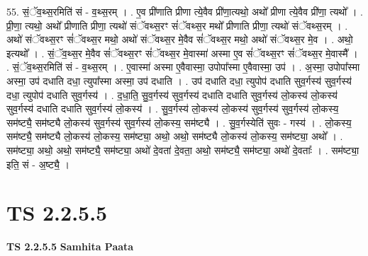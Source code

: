 \documentclass[17pt]{extarticle}
\begin{document}
55. सं॒ॅव॒थ्स॒रमिति॑ सं - व॒थ्स॒रम् । . ए॒व प्री॑णाति प्रीणा त्ये॒वैव प्री॑णा॒त्यथो॒ अथो᳚ प्रीणा त्ये॒वैव प्री॑णा॒ त्यथो᳚ । . प्री॒णा॒ त्यथो॒ अथो᳚ प्रीणाति प्रीणा॒ त्यथो॑ संॅवथ्स॒रꣳ सं॑ॅवथ्स॒र मथो᳚ प्रीणाति प्रीणा॒ त्यथो॑ संॅवथ्स॒रम् । . अथो॑ संॅवथ्स॒रꣳ सं॑ॅवथ्स॒र मथो॒ अथो॑ संॅवथ्स॒र मे॒वैव सं॑ॅवथ्स॒र मथो॒ अथो॑ संॅवथ्स॒र मे॒व । . अथो॒ इत्यथो᳚ । . सं॒ॅव॒थ्स॒र मे॒वैव सं॑ॅवथ्स॒रꣳ सं॑ॅवथ्स॒र मे॒वास्मा॑ अस्मा ए॒व सं॑ॅवथ्स॒रꣳ सं॑ॅवथ्स॒र मे॒वास्मै᳚ । . सं॒ॅव॒थ्स॒रमिति॑ सं - व॒थ्स॒रम् । . ए॒वास्मा॑ अस्मा ए॒वैवास्मा॒ उपोपा᳚स्मा ए॒वैवास्मा॒ उप॑ । . अ॒स्मा॒ उपोपा᳚स्मा अस्मा॒ उप॑ दधाति दधा॒ त्युपा᳚स्मा अस्मा॒ उप॑ दधाति । . उप॑ दधाति दधा॒ त्युपोप॑ दधाति सुव॒र्गस्य॑ सुव॒र्गस्य॑ दधा॒ त्युपोप॑ दधाति सुव॒र्गस्य॑ । . द॒धा॒ति॒ सु॒व॒र्गस्य॑ सुव॒र्गस्य॑ दधाति दधाति सुव॒र्गस्य॑ लो॒कस्य॑ लो॒कस्य॑ सुव॒र्गस्य॑ दधाति दधाति सुव॒र्गस्य॑ लो॒कस्य॑ । . सु॒व॒र्गस्य॑ लो॒कस्य॑ लो॒कस्य॑ सुव॒र्गस्य॑ सुव॒र्गस्य॑ लो॒कस्य॒ सम॑ष्ट्यै॒ सम॑ष्ट्यै लो॒कस्य॑ सुव॒र्गस्य॑ सुव॒र्गस्य॑ लो॒कस्य॒ सम॑ष्ट्यै । . सु॒व॒र्गस्येति॑ सुवः - गस्य॑ । . लो॒कस्य॒ सम॑ष्ट्यै॒ सम॑ष्ट्यै लो॒कस्य॑ लो॒कस्य॒ सम॑ष्ट्या॒ अथो॒ अथो॒ सम॑ष्ट्यै लो॒कस्य॑ लो॒कस्य॒ सम॑ष्ट्या॒ अथो᳚ । . सम॑ष्ट्या॒ अथो॒ अथो॒ सम॑ष्ट्यै॒ सम॑ष्ट्या॒ अथो॑ दे॒वता॑ दे॒वता॒ अथो॒ सम॑ष्ट्यै॒ सम॑ष्ट्या॒ अथो॑ दे॒वताः᳚ । . सम॑ष्ट्या॒ इति॒ सं - अ॒ष्ट्यै॒ । \newline
\pagebreak
{}
\section*{ TS 2.2.5.5 }

\textbf{TS 2.2.5.5 } \newline
\textbf{Samhita Paata} \newline
\end{document}
